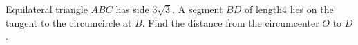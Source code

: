 Equilateral triangle $ABC$ has side $3\sqrt3$. A segment $BD$ of length4 lies on the tangent to the circumcircle at $B$. Find the distance from the circumcenter $O$ to $D$.
